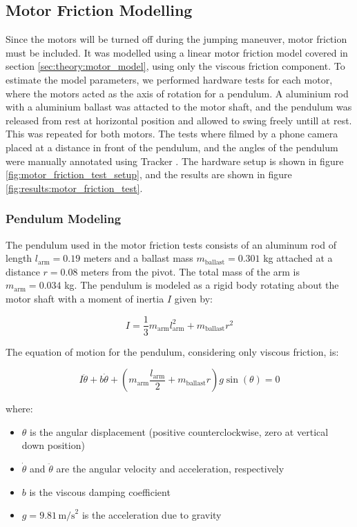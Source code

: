 \subsection{Motor Friction Modelling}
Since the motors will be turned off during the jumping maneuver, motor friction must be included. It was modelled using a linear motor friction model covered in section \ref{sec:theory:motor_model}, using only the viscous friction component. To estimate the model parameters, we performed hardware tests for each motor, where the motors acted as the axis of rotation for a pendulum. A aluminium rod with a aluminium ballast was attacted to the motor shaft, and the pendulum was released from rest at horizontal position and allowed to swing freely untill at rest. This was repeated for both motors. The tests where filmed by a phone camera placed at a distance in front of the pendulum, and the angles of the pendulum were manually annotated using Tracker \cite{tracker}. The hardware setup is shown in figure \ref{fig:motor_friction_test_setup}, and the results are shown in figure \ref{fig:results:motor_friction_test}.


\subsubsection{Pendulum Modeling}

The pendulum used in the motor friction tests consists of an aluminum rod of length \( l_{\text{arm}} = 0.19 \) meters and a ballast mass \( m_{\text{ballast}} = 0.301 \) kg attached at a distance \( r = 0.08 \) meters from the pivot. The total mass of the arm is \( m_{\text{arm}} = 0.034 \) kg. The pendulum is modeled as a rigid body rotating about the motor shaft with a moment of inertia \( I \) given by:

\[
I = \frac{1}{3} m_{\text{arm}} l_{\text{arm}}^2 + m_{\text{ballast}} r^2
\]

The equation of motion for the pendulum, considering only viscous friction, is:

\[
I \ddot{\theta} + b \dot{\theta} + (m_{\text{arm}} \frac{l_{\text{arm}}}{2} + m_{\text{ballast}} r) g \sin(\theta) = 0
\]

where:
\begin{itemize}
    \item \( \theta \) is the angular displacement (positive counterclockwise, zero at vertical down position)
    \item \( \dot{\theta} \) and \( \ddot{\theta} \) are the angular velocity and acceleration, respectively
    \item \( b \) is the viscous damping coefficient
    \item \( g = 9.81 \, \text{m/s}^2 \) is the acceleration due to gravity
\end{itemize}
